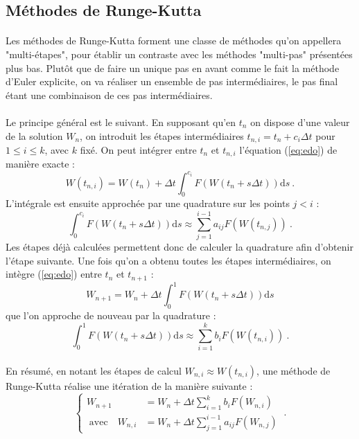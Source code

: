   \subsection{Méthodes de Runge-Kutta}

    \paragraph{}
    Les méthodes de Runge-Kutta forment une classe de méthodes qu'on appellera "multi-étapes", pour établir un contraste avec les méthodes "multi-pas" présentées plus bas.
    Plutôt que de faire un unique pas en avant comme le fait la méthode d'Euler explicite, on va réaliser un ensemble de pas intermédiaires, le pas final étant une combinaison de ces pas intermédiaires.

    \paragraph{}
    Le principe général est le suivant.
    En supposant qu'en $t_n$ on dispose d'une valeur de la solution $W_n$, on introduit les étapes intermédiaires $t_{n,i} = t_n + c_i\Delta t$ pour $1\leq i\leq k$, avec $k$ fixé.
    On peut intégrer entre $t_n$ et $t_{n,i}$ l'équation (\ref{eq:edo}) de manière exacte :
    \[W\left(t_{n,i}\right) = W\left(t_n\right) + \Delta t \int_0^{c_i}F\left(W\left(t_n + s\Delta t\right)\right)\mathrm{d}s\ .\]
    L'intégrale est ensuite approchée par une quadrature sur les points $j<i$ :
    \[\int_0^{c_i}F\left(W\left(t_n + s\Delta t\right)\right)\mathrm{d}s \approx \sum_{j = 1}^{i-1}a_{ij}F\left(W\left(t_{n,j}\right)\right)\ .\]
    Les étapes déjà calculées permettent donc de calculer la quadrature afin d'obtenir l'étape suivante.
    Une fois qu'on a obtenu toutes les étapes intermédiaires, on intègre (\ref{eq:edo}) entre $t_n$ et $t_{n+1}$ :
    \[W_{n+1} = W_n + \Delta t \int_0^1F\left(W\left(t_n + s\Delta t\right)\right)\mathrm{d}s\]
    que l'on approche de nouveau par la quadrature :
    \[\int_0^1F\left(W\left(t_n + s\Delta t\right)\right)\mathrm{d}s \approx \sum_{i = 1}^kb_iF\left(W\left(t_{n,i}\right)\right)\ .\]

    \paragraph{}
    En résumé, en notant les étapes de calcul $W_{n,i} \approx W\left(t_{n,i}\right)$, une méthode de Runge-Kutta réalise une itération de la manière suivante :
    \begin{equation}\label{eq:rk}
      \left\{\begin{aligned}
        W_{n+1} &= W_n + \Delta t\sum_{i = 1}^kb_iF\left(W_{n,i}\right) \\
        \;\textrm{avec}\quad W_{n,i} &= W_n + \Delta t\sum_{j = 1}^{i-1}a_{ij}F\left(W_{n,j}\right)
      \end{aligned}\right.\ .
    \end{equation}

